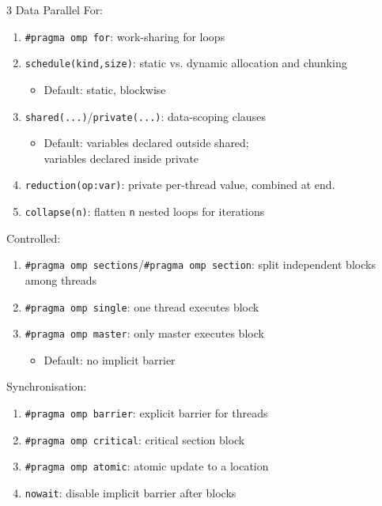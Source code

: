 \documentclass[12pt, a4paper]{article}
\begin{document}
\begin{multicols*}{3}
Data Parallel For:
\begin{enumerate}[\roman*.]
  \item \lstinline|#pragma omp for|: work-sharing for loops
  \item \lstinline|schedule(kind,size)|:  static vs. dynamic allocation and chunking 
    \begin{itemize}[leftmargin=*]\vspace{3pt}
      \item Default: static, blockwise
    \end{itemize}
  \item \lstinline|shared(...)|/\lstinline|private(...)|: data-scoping clauses 
    \begin{itemize}[leftmargin=*]\vspace{3pt}
      \item Default: variables declared outside shared;\\variables declared inside private
    \end{itemize}
  \item \lstinline|reduction(op:var)|: private per-thread value, combined at end.
  \item \lstinline|collapse(n)|: flatten \lstinline|n| nested loops for iterations 
\end{enumerate}

Controlled:
\begin{enumerate}[\roman*.]
  \item \lstinline|#pragma omp sections|/\lstinline|#pragma omp section|: split independent blocks among threads
  \item \lstinline|#pragma omp single|: one thread executes block
  \item \lstinline|#pragma omp master|: only master executes block 
    \begin{itemize}[leftmargin=*]\vspace{3pt}
      \item Default: no implicit barrier
    \end{itemize}
\end{enumerate}

Synchronisation:
\begin{enumerate}[\roman*.]
  \item \lstinline|#pragma omp barrier|: explicit barrier for threads
  \item \lstinline|#pragma omp critical|: critical section block 
  \item \lstinline|#pragma omp atomic|: atomic update to a location 
  \item \lstinline|nowait|: disable implicit barrier after blocks
\end{enumerate}


\end{multicols*}
\end{document}

